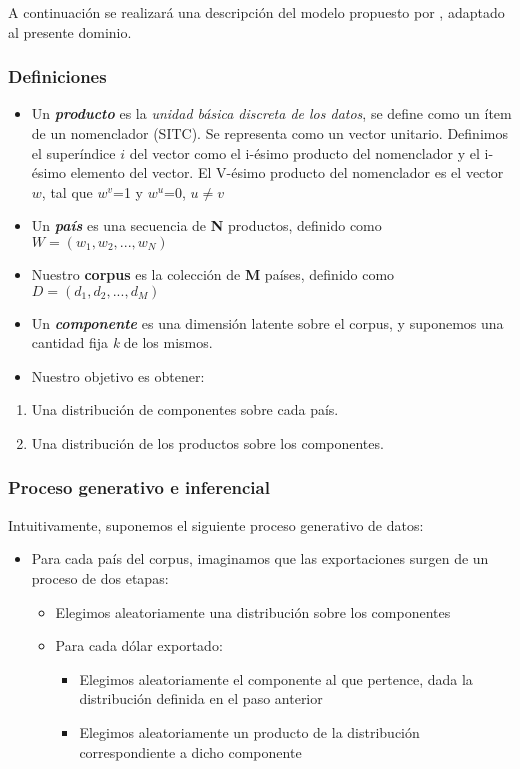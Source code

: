 \documentclass[class=article, crop=false]{standalone}
\begin{document}
A continuación se realizará una descripción del modelo propuesto por \cite{blei2003latent}, adaptado al presente dominio. 
	
\subsubsection{Definiciones}

\begin{itemize}
\item
Un \textbf{\emph{producto}} es la \emph{unidad básica discreta de los
	datos}, se define como un ítem de un nomenclador (SITC). Se representa
como un vector unitario. Definimos el superíndice \(i\) del vector
como el i-ésimo producto del nomenclador y el i-ésimo elemento del
vector. El V-ésimo producto del nomenclador es el vector \(w\), tal
que \(w^v\)=1 y \(w^u\)=0, \(u\neq v\)
\item
Un \textbf{\emph{país}} es una secuencia de \textbf{N} productos,
definido como \(W= (w_1, w_2, ..., w_N)\)
\item
Nuestro \textbf{corpus} es la colección de \textbf{M} países, definido
como \(D = (d_1, d_2,..., d_M)\)
\item
Un \textbf{\emph{componente}} es una dimensión latente sobre el
corpus, y suponemos una cantidad fija \emph{k} de los mismos.
\item
Nuestro objetivo es obtener:
\end{itemize}

\begin{enumerate}
\def\labelenumi{\arabic{enumi}.}
\item
Una distribución de componentes sobre cada país.
\item
Una distribución de los productos sobre los componentes.
\end{enumerate}


\subsubsection{Proceso generativo e inferencial}

Intuitivamente, suponemos el siguiente proceso generativo de datos:

\begin{itemize}
\item
Para cada país del corpus, imaginamos que las exportaciones surgen de
un proceso de dos etapas:

\begin{itemize}
	\item
	Elegimos aleatoriamente una distribución sobre los componentes
	\item
	Para cada dólar exportado:
	
	\begin{itemize}
		\item
		Elegimos aleatoriamente el componente al que pertence, dada la
		distribución definida en el paso anterior
		\item
		Elegimos aleatoriamente un producto de la distribución
		correspondiente a dicho componente
	\end{itemize}
\end{itemize}
\end{itemize}
\end{document}
